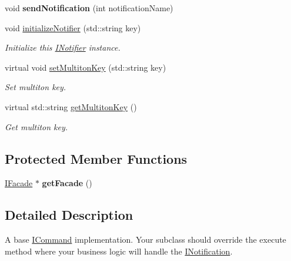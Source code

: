 \begin{DoxyCompactItemize}
\item 
\hypertarget{class_pure_m_v_c_1_1_notifier_a012642026e913c8e30d006e2e8f869c6}{
void {\bfseries sendNotification} (int notificationName)}
\label{class_pure_m_v_c_1_1_notifier_a012642026e913c8e30d006e2e8f869c6}

\item 
void \hyperlink{class_pure_m_v_c_1_1_notifier_a6910365c70415ba7973401215f57e4af}{initializeNotifier} (std::string key)
\begin{DoxyCompactList}\small\item\em Initialize this \hyperlink{class_pure_m_v_c_1_1_i_notifier}{INotifier} instance. \item\end{DoxyCompactList}\item 
virtual void \hyperlink{class_pure_m_v_c_1_1_multiton_key_heir_abc70ef7c066bc8d7bf0196ec727599bb}{setMultitonKey} (std::string key)
\begin{DoxyCompactList}\small\item\em Set multiton key. \item\end{DoxyCompactList}\item 
virtual std::string \hyperlink{class_pure_m_v_c_1_1_multiton_key_heir_aa5622459d33380deb08dc3cab8b991c7}{getMultitonKey} ()
\begin{DoxyCompactList}\small\item\em Get multiton key. \item\end{DoxyCompactList}\end{DoxyCompactItemize}
\subsection*{Protected Member Functions}
\begin{DoxyCompactItemize}
\item 
\hypertarget{class_pure_m_v_c_1_1_notifier_a3eeda7190c0c0a2af8d34074df332bbe}{
\hyperlink{class_pure_m_v_c_1_1_i_facade}{IFacade} $\ast$ {\bfseries getFacade} ()}
\label{class_pure_m_v_c_1_1_notifier_a3eeda7190c0c0a2af8d34074df332bbe}

\end{DoxyCompactItemize}


\subsection{Detailed Description}
A base {\ttfamily \hyperlink{class_pure_m_v_c_1_1_i_command}{ICommand}} implementation. Your subclass should override the {\ttfamily execute} method where your business logic will handle the {\ttfamily \hyperlink{class_pure_m_v_c_1_1_i_notification}{INotification}}. 

